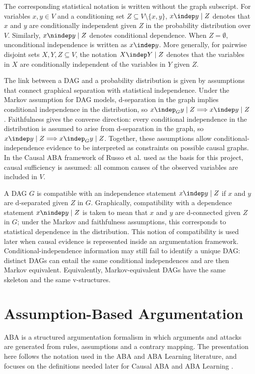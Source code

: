 The corresponding statistical notation is written without the graph subscript. For variables \(x,y \in V\) and a conditioning set \(Z \subseteq V \setminus \{x,y\}\), \(x \indep y \mid Z\) denotes that \(x\) and \(y\) are conditionally independent given \(Z\) in the probability distribution over \(V\). Similarly, \(x \nindep y \mid Z\) denotes conditional dependence. When \(Z=\emptyset\), unconditional independence is written as \(x \indep y\). More generally, for pairwise disjoint sets \(X,Y,Z \subseteq V\), the notation \(X \indep Y \mid Z\) denotes that the variables in \(X\) are conditionally independent of the variables in \(Y\) given \(Z\).

The link between a DAG and a probability distribution is given by assumptions that connect graphical separation with statistical independence. Under the Markov assumption for DAG models, d-separation in the graph implies conditional independence in the distribution, so \(x \indep_G y \mid Z \Longrightarrow x \indep y \mid Z\). Faithfulness gives the converse direction: every conditional independence in the distribution is assumed to arise from d-separation in the graph, so \(x \indep y \mid Z \Longrightarrow x \indep_G y \mid Z\). Together, these assumptions allow conditional-independence evidence to be interpreted as constraints on possible causal graphs. In the Causal ABA framework of Russo et al. used as the basis for this project, causal sufficiency is assumed: all common causes of the observed variables are included in \(V\).

A DAG \(G\) is compatible with an independence statement \(x \indep y \mid Z\) if \(x\) and \(y\) are d-separated given \(Z\) in \(G\). Graphically, compatibility with a dependence statement \(x \nindep y \mid Z\) is taken to mean that \(x\) and \(y\) are d-connected given \(Z\) in \(G\); under the Markov and faithfulness assumptions, this corresponds to statistical dependence in the distribution. This notion of compatibility is used later when causal evidence is represented inside an argumentation framework. Conditional-independence information may still fail to identify a unique DAG: distinct DAGs can entail the same conditional independences and are then Markov equivalent. Equivalently, Markov-equivalent DAGs have the same skeleton and the same v-structures.

\section{Assumption-Based Argumentation}
ABA is a structured argumentation formalism in which arguments and attacks are generated from rules, assumptions and a contrary mapping. The presentation here follows the notation used in the ABA and ABA Learning literature, and focuses on the definitions needed later for Causal ABA and ABA Learning \cite{bondarenko1997abstract,toni2014tutorial}.

